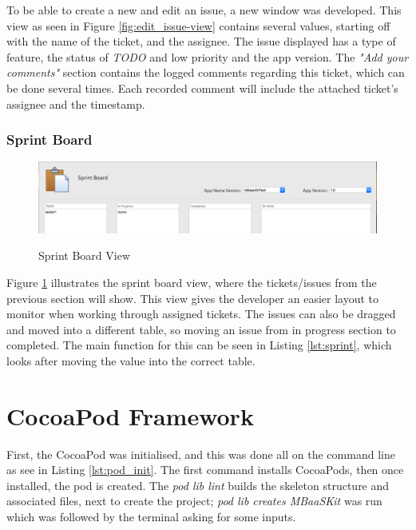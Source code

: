 To be able to create a new and edit an issue, a new window was developed. This view as seen in Figure \ref{fig:edit_issue-view} contains several values, starting off with the name of the ticket, and the assignee. The issue displayed has a type of feature, the status of \textit{TODO} and low priority and the app version. The \textit{"Add your comments"} section contains the logged comments regarding this ticket, which can be done several times. Each recorded comment will include the attached ticket's assignee and the timestamp.

\subsubsection{Sprint Board}

\begin{figure}[!h]
    \caption{Sprint Board View}
    \centering
    \includegraphics[width=150mm]{images/dashboard/sprint-board}
    \label{fig:sprint-board-view}
\end{figure} 

Figure \ref{fig:sprint-board-view} illustrates the sprint board view, where the tickets/issues from the previous section will show. This view gives the developer an easier layout to monitor when working through assigned tickets. The issues can also be dragged and moved into a different table, so moving an issue from in progress section to completed. The main function for this can be seen in Listing \ref{lst:sprint}, which looks after moving the value into the correct table.



\section{CocoaPod Framework}

First, the CocoaPod was initialised, and this was done all on the command line as see in Listing \ref{lst:pod_init}. The first command installs CocoaPods, then once installed, the pod is created. The \textit{pod lib lint} builds the skeleton structure and associated files, next to create the project; \textit{pod lib creates MBaaSKit} was run which was followed by the terminal asking for some inputs.

